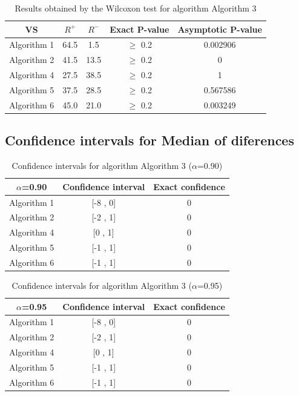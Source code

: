 \documentclass[a4paper,10pt]{article}
\begin{document}
\begin{table}[!htp]
\centering\small
\begin{tabular}{
|c|c|c|c|c|}
\hline
 VS & $R^{+}$ & $R^{-}$ & Exact P-value & Asymptotic P-value \\ \hline 
Algorithm 1 & 64.5 & 1.5 & $\geq$ 0.2 & 0.002906\\ \hline 
Algorithm 2 & 41.5 & 13.5 & $\geq$ 0.2 & 0\\ \hline 
Algorithm 4 & 27.5 & 38.5 & $\geq$ 0.2 & 1\\ \hline 
Algorithm 5 & 37.5 & 28.5 & $\geq$ 0.2 & 0.567586\\ \hline 
Algorithm 6 & 45.0 & 21.0 & $\geq$ 0.2 & 0.003249\\ \hline 

\end{tabular}
\caption{Results obtained by the Wilcoxon test for algorithm Algorithm 3}
\end{table}

\subsection{Confidence intervals for Median of diferences}

\begin{table}[!htp]
\centering\small
\begin{tabular}{
|c|c|c|}
\hline
 $\alpha$=0.90 & Confidence interval & Exact confidence \\ \hline 
Algorithm 1 & [-8 , 0] & 0\\ \hline 
Algorithm 2 & [-2 , 1] & 0\\ \hline 
Algorithm 4 & [0 , 1] & 0\\ \hline 
Algorithm 5 & [-1 , 1] & 0\\ \hline 
Algorithm 6 & [-1 , 1] & 0\\ \hline 

\end{tabular}
\caption{Confidence intervals for algorithm Algorithm 3 ($\alpha$=0.90)}
\end{table}
\begin{table}[!htp]
\centering\small
\begin{tabular}{
|c|c|c|}
\hline
 $\alpha$=0.95 & Confidence interval & Exact confidence \\ \hline 
Algorithm 1 & [-8 , 0] & 0\\ \hline 
Algorithm 2 & [-2 , 1] & 0\\ \hline 
Algorithm 4 & [0 , 1] & 0\\ \hline 
Algorithm 5 & [-1 , 1] & 0\\ \hline 
Algorithm 6 & [-1 , 1] & 0\\ \hline 

\end{tabular}
\caption{Confidence intervals for algorithm Algorithm 3 ($\alpha$=0.95)}
\end{table}
\end{document}
